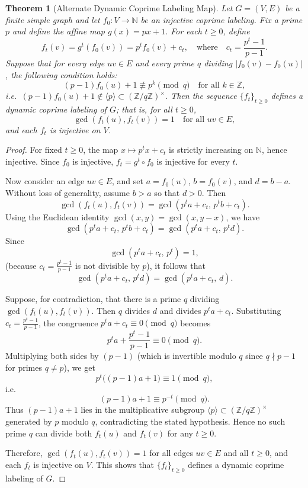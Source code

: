 \documentclass[12pt]{amsart}
\theoremstyle{plain}
\newtheorem{thm}{Theorem}[section]
\theoremstyle{definition}
\theoremstyle{remark}
\numberwithin{equation}{section}
\begin{document}
\begin{thm}[Alternate Dynamic Coprime Labeling Map]\label{thm:alternate-map}
Let $G = (V,E)$ be a finite simple graph and let $f_0 : V \to \mathbb{N}$ be an injective coprime labeling. Fix a prime $p$ and define the affine map $g(x) = p x + 1$. For each $t \ge 0$, define
\[
f_t(v) = g^t(f_0(v)) = p^t f_0(v) + c_t, \quad \text{where} \quad c_t = \frac{p^t - 1}{p - 1}.
\]
Suppose that for every edge $uv \in E$ and every prime $q$ dividing $|f_0(v) - f_0(u)|$, the following condition holds:
\[
(p - 1)f_0(u) + 1 \not\equiv p^k \pmod{q}\quad \text{for all }k\in\mathbb{Z},
\]
i.e.\ $(p - 1)f_0(u) + 1 \notin \langle p \rangle \subset (\mathbb{Z}/q\mathbb{Z})^\times$. Then the sequence $\{f_t\}_{t \ge 0}$ defines a dynamic coprime labeling of $G$; that is, for all $t \ge 0$,
\[
\gcd(f_t(u), f_t(v)) = 1 \quad \text{for all } uv \in E,
\]
and each $f_t$ is injective on $V$.
\end{thm}

\begin{proof}
For fixed $t\ge0$, the map $x \mapsto p^t x + c_t$ is strictly increasing on $\mathbb{N}$, hence injective. Since $f_0$ is injective, $f_t = g^t \circ f_0$ is injective for every $t$.

Now consider an edge $uv \in E$, and set $a = f_0(u)$, $b = f_0(v)$, and $d = b - a$. Without loss of generality, assume $b > a$ so that $d > 0$. Then
\[
\gcd(f_t(u), f_t(v)) = \gcd(p^t a + c_t,\, p^t b + c_t).
\]
Using the Euclidean identity $\gcd(x, y) = \gcd(x, y - x)$, we have
\[
\gcd(p^t a + c_t,\, p^t b + c_t) = \gcd(p^t a + c_t,\, p^t d).
\]
Since
\[
\gcd(p^t a + c_t,\, p^t) = 1,
\]
(because $c_t=\frac{p^t-1}{p-1}$ is not divisible by $p$), it follows that
\[
\gcd(p^t a + c_t,\, p^t d) = \gcd(p^t a + c_t,\, d).
\]

Suppose, for contradiction, that there is a prime $q$ dividing $\gcd(f_t(u),f_t(v))$. Then $q$ divides $d$ and divides $p^t a + c_t$. Substituting $c_t = \frac{p^t - 1}{p - 1}$, the congruence $p^t a + c_t \equiv 0 \pmod{q}$ becomes
\[
p^t a + \frac{p^t - 1}{p - 1} \equiv 0 \pmod{q}.
\]
Multiplying both sides by $(p - 1)$ (which is invertible modulo $q$ since $q\nmid p-1$ for primes $q\neq p$), we get
\[
p^t\bigl((p - 1)a + 1\bigr) \equiv 1 \pmod{q},
\]
i.e.
\[
(p - 1)a + 1 \equiv p^{-t} \pmod{q}.
\]
Thus $(p-1)a+1$ lies in the multiplicative subgroup $\langle p\rangle\subset(\mathbb{Z}/q\mathbb{Z})^\times$ generated by $p$ modulo $q$, contradicting the stated hypothesis. Hence no such prime $q$ can divide both $f_t(u)$ and $f_t(v)$ for any $t\ge0$.

Therefore, $\gcd(f_t(u),f_t(v)) = 1$ for all edges $uv \in E$ and all $t \ge 0$, and each $f_t$ is injective on $V$. This shows that $\{f_t\}_{t \ge 0}$ defines a dynamic coprime labeling of $G$.
\end{proof}
\end{document}
